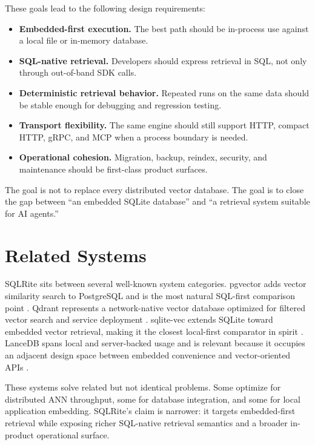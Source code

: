 \documentclass[11pt]{article}
\begin{document}
These goals lead to the following design requirements:
\begin{itemize}[leftmargin=*, itemsep=0.2em]
  \item \textbf{Embedded-first execution.} The best path should be in-process use against a local file or in-memory database.
  \item \textbf{SQL-native retrieval.} Developers should express retrieval in SQL, not only through out-of-band SDK calls.
  \item \textbf{Deterministic retrieval behavior.} Repeated runs on the same data should be stable enough for debugging and regression testing.
  \item \textbf{Transport flexibility.} The same engine should still support HTTP, compact HTTP, gRPC, and MCP when a process boundary is needed.
  \item \textbf{Operational cohesion.} Migration, backup, reindex, security, and maintenance should be first-class product surfaces.
\end{itemize}

The goal is not to replace every distributed vector database. The goal is to close the gap between ``an embedded SQLite database'' and ``a retrieval system suitable for AI agents.''

\section{Related Systems}
SQLRite sits between several well-known system categories. pgvector adds vector similarity search to PostgreSQL and is the most natural SQL-first comparison point \citep{pgvector2026}. Qdrant represents a network-native vector database optimized for filtered vector search and service deployment \citep{qdrant2026}. sqlite-vec extends SQLite toward embedded vector retrieval, making it the closest local-first comparator in spirit \citep{sqlitevec2026}. LanceDB spans local and server-backed usage and is relevant because it occupies an adjacent design space between embedded convenience and vector-oriented APIs \citep{lancedb2026}.

These systems solve related but not identical problems. Some optimize for distributed ANN throughput, some for database integration, and some for local application embedding. SQLRite's claim is narrower: it targets embedded-first retrieval while exposing richer SQL-native retrieval semantics and a broader in-product operational surface.
\end{document}
